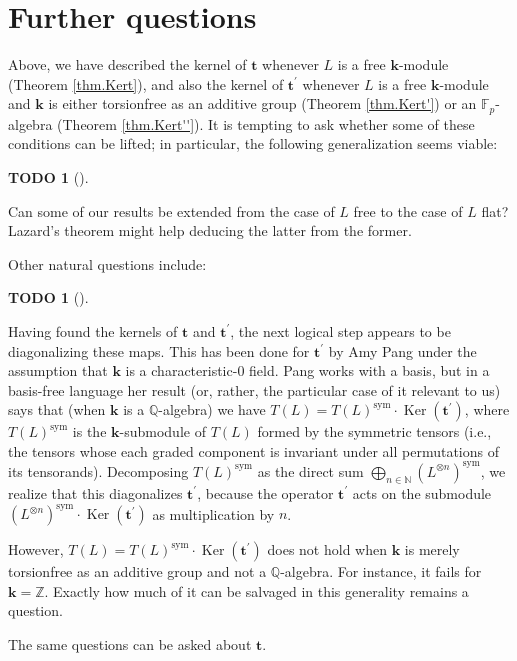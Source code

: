 \documentclass[numbers=enddot,12pt,final,onecolumn,notitlepage]{scrartcl}%
\theoremstyle{definition}
\newtheorem{quest}[theo]{TODO}
\newenvironment{todo}[1][]
{\begin{quest}[#1]\begin{leftbar}}
{\end{leftbar}\end{quest}}
\begin{document}
\section{Further questions}

Above, we have described the kernel of $\mathbf{t}$ whenever $L$ is a free
$\mathbf{k}$-module (Theorem \ref{thm.Kert}), and also the kernel of
$\mathbf{t}^{\prime}$ whenever $L$ is a free $\mathbf{k}$-module and
$\mathbf{k}$ is either torsionfree as an additive group (Theorem
\ref{thm.Kert'}) or an $\mathbb{F}_{p}$-algebra (Theorem \ref{thm.Kert''}). It
is tempting to ask whether some of these conditions can be lifted; in
particular, the following generalization seems viable:

\begin{todo}
Can some of our results be extended from the case of $L$ free to the case of
$L$ flat? Lazard's theorem might help deducing the latter from the former.
\end{todo}

Other natural questions include:

\begin{todo}
Having found the kernels of $\mathbf{t}$ and $\mathbf{t}^{\prime}$, the next
logical step appears to be diagonalizing these maps. This has been done for
$\mathbf{t}^{\prime}$ by Amy Pang \cite[Theorem 5.1]{pang} under the
assumption that $\mathbf{k}$ is a characteristic-$0$ field. Pang works with a
basis, but in a basis-free language her result (or, rather, the particular
case of it relevant to us) says that (when $\mathbf{k}$ is a $\mathbb{Q}%
$-algebra) we have $T\left(  L\right)  =T\left(  L\right)
^{\operatorname*{sym}}\cdot\operatorname*{Ker}\left(  \mathbf{t}^{\prime
}\right)  $, where $T\left(  L\right)  ^{\operatorname*{sym}}$ is the
$\mathbf{k}$-submodule of $T\left(  L\right)  $ formed by the symmetric
tensors (i.e., the tensors whose each graded component is invariant under all
permutations of its tensorands). Decomposing $T\left(  L\right)
^{\operatorname*{sym}}$ as the direct sum $\bigoplus_{n\in\mathbb{N}}\left(
L^{\otimes n}\right)  ^{\operatorname*{sym}}$, we realize that this
diagonalizes $\mathbf{t}^{\prime}$, because the operator $\mathbf{t}^{\prime}$
acts on the submodule $\left(  L^{\otimes n}\right)  ^{\operatorname*{sym}%
}\cdot\operatorname*{Ker}\left(  \mathbf{t}^{\prime}\right)  $ as
multiplication by $n$.

However, $T\left(  L\right)  =T\left(  L\right)  ^{\operatorname*{sym}}%
\cdot\operatorname*{Ker}\left(  \mathbf{t}^{\prime}\right)  $ does not hold
when $\mathbf{k}$ is merely torsionfree as an additive group and not a
$\mathbb{Q}$-algebra. For instance, it fails for $\mathbf{k}=\mathbb{Z}$.
Exactly how much of it can be salvaged in this generality remains a question.

The same questions can be asked about $\mathbf{t}$.
\end{todo}
\end{document}
